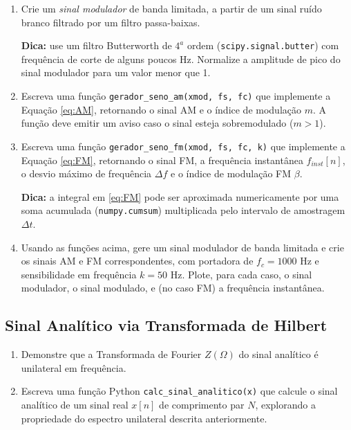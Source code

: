 \documentclass[a4paper,twoside,12pt]{article}
\begin{document}
	\begin{enumerate}

		\item Crie um \emph{sinal modulador} de banda limitada, a partir de um sinal ruído branco filtrado por um filtro passa-baixas.
		
		\textbf{Dica:} use um filtro Butterworth de $4^a$ ordem (\texttt{scipy.signal.butter}) com frequência de corte de alguns poucos Hz. Normalize a amplitude de pico do sinal modulador para um valor menor que 1.
		
		\item Escreva uma função \texttt{gerador\_seno\_am(xmod, fs, fc)} que implemente a Equação \eqref{eq:AM}, retornando o sinal AM e o índice de modulação $m$. A função deve emitir um aviso caso o sinal esteja sobremodulado ($m>1$).
		
		\item Escreva uma função \texttt{gerador\_seno\_fm(xmod, fs, fc, k)} que implemente a Equação \eqref{eq:FM}, retornando o sinal FM, a frequência instantânea $f_{inst}[n]$, o desvio máximo de frequência $\Delta f$ e o índice de modulação FM $\beta$.
		
		\textbf{Dica:} a integral em \eqref{eq:FM} pode ser aproximada numericamente por uma soma acumulada (\texttt{numpy.cumsum}) multiplicada pelo intervalo de amostragem $\Delta t$.
		
		\item Usando as funções acima, gere um sinal modulador de banda limitada e crie os sinais AM e FM correspondentes, com portadora de $f_c = 1000$ Hz e sensibilidade em frequência $k=50$ Hz. Plote, para cada caso, o sinal modulador, o sinal modulado, e (no caso FM) a frequência instantânea.
		
	\end{enumerate}
	
	
	\subsection{Sinal Analítico via Transformada de Hilbert}
	\label{sec:tarefas2}
	
	\begin{enumerate}
		\item Demonstre que a Transformada de Fourier $Z(\Omega)$ do sinal analítico é unilateral em frequência.
		
		\item Escreva uma função Python \texttt{calc\_sinal\_analitico(x)} que calcule o sinal analítico de um sinal real $x[n]$ de comprimento par $N$, explorando a propriedade do espectro unilateral descrita anteriormente.
		
	\end{enumerate}
	
\end{document}
